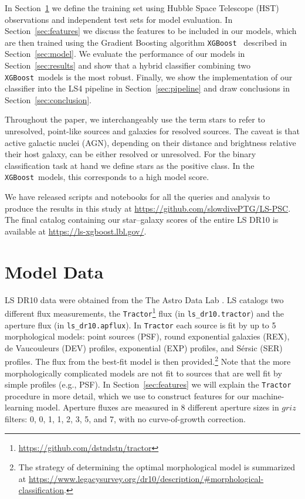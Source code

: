 \documentclass[twocolumn]{aastex631}
\newcommand{\xgboost}{\texttt{XGBoost}}
\newcommand{\dr}[1]{DR{#1}}
\begin{document}
\begin{CJK*}{UTF8}{gbsn}
In Section~\ref{sec:data} we define the training set using Hubble Space Telescope (HST) observations and independent test sets for model evaluation. In Section~\ref{sec:features} we discuss the features to be included in our models, which are then trained using the Gradient Boosting algorithm \xgboost\ \citep{XGBoost_2016} described in Section~\ref{sec:model}. We evaluate the performance of our models in Section~\ref{sec:results} and show that a hybrid classifier combining two \xgboost\ models is the most robust. Finally, we show the implementation of our classifier into the LS4 pipeline in Section~\ref{sec:pipeline} and draw conclusions in Section~\ref{sec:conclusion}.

Throughout the paper, we interchangeably use the term stars to refer to unresolved, point-like sources and galaxies for resolved sources. The caveat is that active galactic nuclei (AGN), depending on their distance and brightness relative their host galaxy, can be either resolved or unresolved. For the binary classification task at hand we define stars as the positive class. In the \xgboost\ models, this corresponds to a high model score. %

We have released scripts and notebooks for all the queries and analysis to produce the results in this study at \url{https://github.com/slowdivePTG/LS-PSC}. The final catalog containing our star--galaxy scores of the entire LS \dr{10} is available at \url{https://ls-xgboost.lbl.gov/}.

\section{Model Data}\label{sec:data}
LS \dr{10} data were obtained from the The Astro Data Lab \citep{Fitzpatrick_2014,Nikutta_2020}. LS catalogs two different flux measurements, the \texttt{Tractor}\footnote{\url{https://github.com/dstndstn/tractor}} flux (in \texttt{ls\_dr10.tractor}) and the aperture flux (in \texttt{ls\_dr10.apflux}). In \texttt{Tractor} each source is fit by up to 5 morphological models: point sources (PSF), round exponential galaxies (REX), de Vaucouleurs (DEV) profiles, exponential (EXP) profiles, and S\'ersic (SER) profiles. The flux from the best-fit model is then provided.\footnote{The strategy of determining the optimal morphological model is summarized at \url{https://www.legacysurvey.org/dr10/description/\#morphological-classification}.} Note that the more morphologically complicated models are not fit to sources that are well fit by simple profiles (e.g., PSF). In Section~\ref{sec:features} we will explain the \texttt{Tractor} procedure in more detail, which we use to construct features for our machine-learning model. Aperture fluxes are measured in 8 different aperture sizes in $griz$ filters: 0, 0, 1, 1, 2, 3, 5, and 7, with no curve-of-growth correction.


\end{CJK*}
\end{document}
